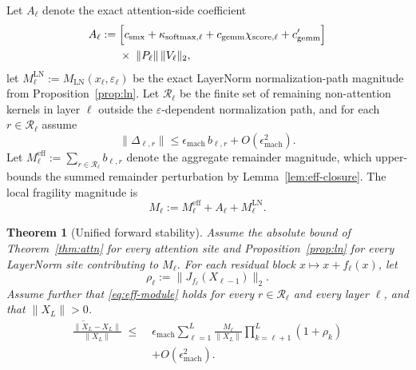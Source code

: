 \documentclass[twoside]{article}
\newtheorem{theorem}{Theorem}
\theoremstyle{definition}
\theoremstyle{remark}
\begin{document}
Let $A_\ell$ denote the exact attention-side coefficient
\begin{equation}
\label{eq:attn-contrib}
\begin{split}
A_\ell
:=\;&
\Bigl[
c_{\mathrm{smx}}
+
\kappa_{\mathrm{softmax},\ell}
+
c_{\mathrm{gemm}}\chi_{\mathrm{score},\ell}
+
c'_{\mathrm{gemm}}
\Bigr]
\\
&\times\;\|P_\ell\|\,\|V_\ell\|_2,
\end{split}
\end{equation}
let $M^{\mathrm{LN}}_\ell := M_{\mathrm{LN}}(x_\ell,\varepsilon_\ell)$ be the
exact LayerNorm normalization-path magnitude from Proposition~\ref{prop:ln}.
Let $\mathcal{R}_\ell$ be the finite set of remaining non-attention kernels in
layer $\ell$ outside the $\varepsilon$-dependent normalization path, and for
each $r \in \mathcal{R}_\ell$ assume
\begin{equation}
\label{eq:eff-module}
\|\Delta_{\ell,r}\|
\le
\epsilon_{\mathrm{mach}}\,b_{\ell,r}
+ O(\epsilon_{\mathrm{mach}}^2).
\end{equation}
Let $M^{\mathrm{eff}}_\ell := \sum_{r\in\mathcal{R}_\ell} b_{\ell,r}$ denote the
aggregate remainder magnitude, which upper-bounds the summed remainder
perturbation by Lemma~\ref{lem:eff-closure}. The local fragility magnitude is
\begin{equation}
\label{eq:local-coeff}
M_\ell
:=
M^{\mathrm{eff}}_\ell
+
A_\ell
+
M^{\mathrm{LN}}_\ell.
\end{equation}

\begin{theorem}[Unified forward stability]
\label{thm:unified}
Assume the absolute bound of Theorem~\ref{thm:attn} for every attention site and
Proposition~\ref{prop:ln} for every LayerNorm site contributing to $M_\ell$.
For each residual block $x\mapsto x+f_\ell(x)$, let
\[
\rho_\ell := \|J_{f_\ell}(X_{\ell-1})\|_2.
\]
Assume further that \eqref{eq:eff-module} holds for every $r\in\mathcal{R}_\ell$
and every layer $\ell$, and that $\|X_L\|>0$.
\begin{equation}
\label{eq:unified}
\begin{split}
\frac{\|\widetilde{X}_L - X_L\|}{\|X_L\|}
\;\le\;&
\epsilon_{\mathrm{mach}}
\sum_{\ell=1}^{L}
\frac{M_\ell}{\|X_L\|}
\prod_{k=\ell+1}^{L}(1+\rho_k)
\\
&+
O(\epsilon_{\mathrm{mach}}^2).
\end{split}
\end{equation}
\end{theorem}
\end{document}
